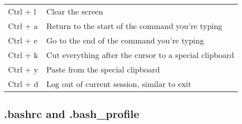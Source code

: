 \begin{longtable}[]{@{}ll@{}}
\begin{minipage}[t]{0.17\columnwidth}\raggedright\strut
Ctrl + l\strut
\end{minipage} & \begin{minipage}[t]{0.77\columnwidth}\raggedright\strut
Clear the screen\strut
\end{minipage}\tabularnewline
\begin{minipage}[t]{0.17\columnwidth}\raggedright\strut
Ctrl + a\strut
\end{minipage} & \begin{minipage}[t]{0.77\columnwidth}\raggedright\strut
Return to the start of the command you're typing\strut
\end{minipage}\tabularnewline
\begin{minipage}[t]{0.17\columnwidth}\raggedright\strut
Ctrl + e\strut
\end{minipage} & \begin{minipage}[t]{0.77\columnwidth}\raggedright\strut
Go to the end of the command you're typing\strut
\end{minipage}\tabularnewline
\begin{minipage}[t]{0.17\columnwidth}\raggedright\strut
Ctrl + k\strut
\end{minipage} & \begin{minipage}[t]{0.77\columnwidth}\raggedright\strut
Cut everything after the cursor to a special clipboard\strut
\end{minipage}\tabularnewline
\begin{minipage}[t]{0.17\columnwidth}\raggedright\strut
Ctrl + y\strut
\end{minipage} & \begin{minipage}[t]{0.77\columnwidth}\raggedright\strut
Paste from the special clipboard\strut
\end{minipage}\tabularnewline
\begin{minipage}[t]{0.17\columnwidth}\raggedright\strut
Ctrl + d\strut
\end{minipage} & \begin{minipage}[t]{0.77\columnwidth}\raggedright\strut
Log out of current session, similar to exit\strut
\end{minipage}\tabularnewline
\bottomrule
\end{longtable}

\subsection{.bashrc and .bash\_profile}\label{bashrc-and-.bash_profile}

